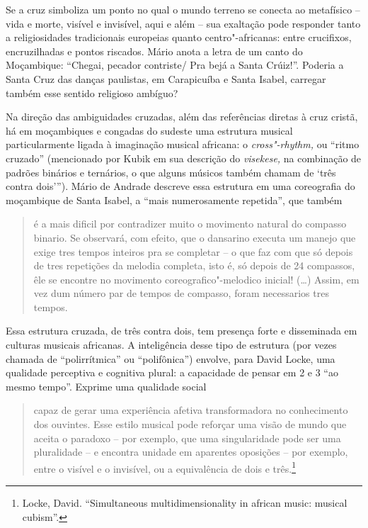 Se a cruz simboliza um ponto no qual o mundo terreno se conecta ao
metafísico -- vida e morte, visível e invisível, aqui e além -- sua
exaltação pode responder tanto a religiosidades tradicionais europeias
quanto centro"-africanas: entre crucifixos, encruzilhadas e pontos
riscados. Mário anota a letra de um canto do Moçambique: ``Chegai,
pecador contriste/ Pra bejá a Santa Crúiz!''. Poderia a Santa Cruz das
danças paulistas, em Carapicuíba e Santa Isabel, carregar também esse
sentido religioso ambíguo?

Na direção das ambiguidades cruzadas, além das referências diretas à
cruz cristã, há em moçambiques e congadas do sudeste uma estrutura
musical particularmente ligada à imaginação musical africana: o
\emph{cross"-rhythm,} ou ``ritmo cruzado'' (mencionado por Kubik em sua
descrição do \emph{visekese,} na combinação de padrões binários e
ternários, o que alguns músicos também chamam de `três contra dois''').
Mário de Andrade descreve essa estrutura em uma coreografia do
moçambique de Santa Isabel, a ``mais numerosamente repetida'', que
também

\begin{quote}
é a mais dificil por contradizer muito o movimento natural do compasso
binario. Se observará, com efeito, que o dansarino executa um manejo que
exige tres tempos inteiros pra se completar -- o que faz com que só
depois de tres repetições da melodia completa, isto é, só depois de 24
compassos, êle se encontre no movimento coreografico"-melodico inicial!
(\ldots{}) Assim, em vez dum número par de tempos de compasso, foram
necessarios tres tempos.
\end{quote}

Essa estrutura cruzada, de três contra dois, tem presença forte e
disseminada em culturas musicais africanas. A inteligência desse tipo de
estrutura (por vezes chamada de ``polirrítmica'' ou ``polifônica'')
envolve, para David Locke, uma qualidade perceptiva e cognitiva plural:
a capacidade de pensar em 2 e 3 ``ao mesmo tempo''. Exprime uma
qualidade social

\begin{quote}
capaz de gerar uma experiência afetiva transformadora no conhecimento
dos ouvintes. Esse estilo musical pode reforçar uma visão de mundo que
aceita o paradoxo -- por exemplo, que uma singularidade pode ser uma
pluralidade -- e encontra unidade em aparentes oposições -- por exemplo,
entre o visível e o invisível, ou a equivalência de dois e
três.\footnote{Locke, David. ``Simultaneous multidimensionality in
  african music: musical cubism''.}
\end{quote}

